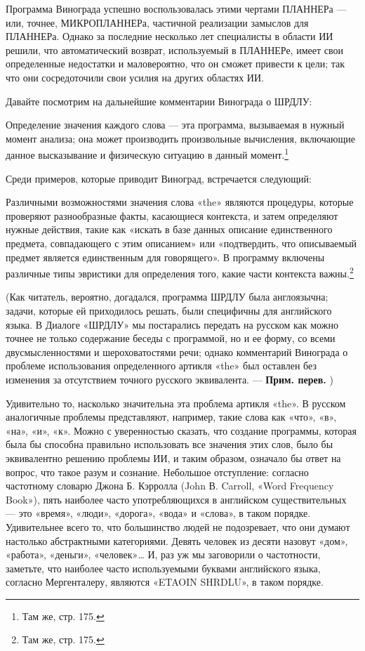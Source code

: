 Программа Винограда успешно воспользовалась этими чертами ПЛАННЕРа --- или, точнее, МИКРОПЛАННЕРа, частичной реализации замыслов для ПЛАННЕРа. Однако за последние несколько лет специалисты в области ИИ решили, что автоматический возврат, используемый в ПЛАННЕРе, имеет свои определенные недостатки и маловероятно, что он сможет привести к цели; так что они сосредоточили свои усилия на других областях ИИ.

Давайте посмотрим на дальнейшие комментарии Винограда о ШРДЛУ:

Определение значения каждого слова --- эта программа, вызываемая в нужный момент анализа; она может производить произвольные вычисления, включающие данное высказывание и физическую ситуацию в данный момент.\footnote{Там же, стр. 175.}

Среди примеров, которые приводит Виноград, встречается следующий:

Различными возможностями значения слова «the» являются процедуры, которые проверяют разнообразные факты, касающиеся контекста, и затем определяют нужные действия, такие как «искать в базе данных описание единственного предмета, совпадающего с этим описанием» или «подтвердить, что описываемый предмет является единственным для говорящего». В программу включены различные типы эвристики для определения того, какие части контекста важны.\footnote{Там же, стр. 175.}

(Как читатель, вероятно, догадался, программа ШРДЛУ была англоязычна; задачи, которые ей приходилось решать, были специфичны для английского языка. В Диалоге «ШРДЛУ» мы постарались передать на русском как можно точнее не только содержание беседы с программой, но и ее форму, со всеми двусмысленностями и шероховатостями речи; однако комментарий Винограда о проблеме использования определенного артикля «the» был оставлен без изменения за отсутствием точного русского эквивалента. --- \textbf{Прим. перев.} )

Удивительно то, насколько значительна эта проблема артикля «the». В русском аналогичные проблемы представляют, например, такие слова как «что», «в», «на», «и», «к». Можно с уверенностью сказать, что создание программы, которая была бы способна правильно использовать все значения этих слов, было бы эквивалентно решению проблемы ИИ, и таким образом, означало бы ответ на вопрос, что такое разум и сознание. Небольшое отступление: согласно частотному словарю Джона Б. Кэрролла (John В. Carroll, «Word Frequency Book»), пять наиболее часто употребляющихся в английском существительных --- это «время», «люди», «дорога», «вода» и «слова», в таком порядке. Удивительнее всего то, что большинство людей не подозревает, что они думают настолько абстрактными категориями. Девять человек из десяти назовут «дом», «работа», «деньги», «человек»\ldots{} И, раз уж мы заговорили о частотности, заметьте, что наиболее часто используемыми буквами английского языка, согласно Мергенталеру, являются «ETAOIN SHRDLU», в таком порядке.

